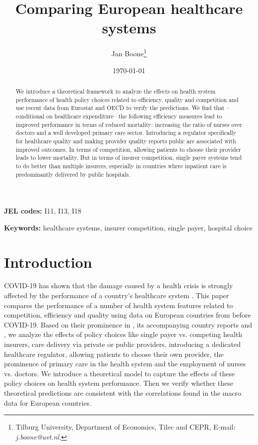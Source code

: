 \documentclass[a4paper,12pt]{article}
\author{Jan Boone\thanks{Tilburg University, Department of Economics, Tilec and CEPR, E-mail: \textit{j.boone@uvt.nl}.}}
\date{\today}
\title{Comparing European healthcare systems}
\begin{document}
\maketitle
\begin{abstract}
We introduce a theoretical framework to analyze the effects on health system performance of health policy choices related to efficiency, quality and competition and use recent data from Eurostat and OECD to verify the predictions. We find that --conditional on healthcare expenditure-- the following efficiency measures lead to improved performance in terms of reduced mortality:  increasing the ratio of nurses over doctors and a well developed primary care sector. Introducing a regulator specifically for healthcare quality and making provider quality reports public are associated with improved outcomes. In terms of competition, allowing patients to choose their provider leads to lower mortality. But in terms of insurer competition, single payer systems tend to do better than multiple insurers, especially in countries where inpatient care is predominantly delivered by public hospitals.
\end{abstract}

\textbf{JEL codes:} I11, I13, I18

\textbf{Keywords:} healthcare systems, insurer competition, single payer, hospital choice



\newpage

\section{Introduction}
\label{sec:org7344f71}

COVID-19 has shown that the damage caused by a health crisis is strongly affected by the performance of a country's healthcare system \citep{OECD_2020}. This paper compares the performance of a number of health system features related to competition, efficiency and quality using data on European countries from before COVID-19. Based on their prominence in \cite{countryprofileReport}, its accompanying country reports and \cite{OECD_2020}, we analyze the effects of policy choices like single payer vs. competing health insurers, care delivery via private or public providers, introducing a dedicated healthcare regulator, allowing patients to choose their own provider, the prominence of primary care in the health system and the employment of nurses vs. doctors. We introduce a theoretical model to capture the effects of these policy choices on health system performance. Then we verify whether these theoretical predictions are consistent with the correlations found in the macro data for European countries.
\end{document}
